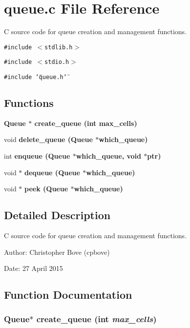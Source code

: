\section{queue.c File Reference}
\label{queue_8c}
C source code for queue creation and management functions. 

{\tt \#include $<$stdlib.h$>$}\par
{\tt \#include $<$stdio.h$>$}\par
{\tt \#include \char`\"{}queue.h\char`\"{}}\par
\subsection*{Functions}
\begin{CompactItemize}
\item 
\bf{Queue} $\ast$ \bf{create\_\-queue} (int max\_\-cells)
\item 
void \bf{delete\_\-queue} (\bf{Queue} $\ast$which\_\-queue)
\item 
int \bf{enqueue} (\bf{Queue} $\ast$which\_\-queue, void $\ast$ptr)
\item 
void $\ast$ \bf{dequeue} (\bf{Queue} $\ast$which\_\-queue)
\item 
void $\ast$ \bf{peek} (\bf{Queue} $\ast$which\_\-queue)
\end{CompactItemize}


\subsection{Detailed Description}
C source code for queue creation and management functions. 

\begin{Desc}
\item[Author:]Christopher Bove (cpbove) \end{Desc}
\begin{Desc}
\item[Date:]27 April 2015 \end{Desc}


\subsection{Function Documentation}
\subsubsection{\setlength{\rightskip}{0pt plus 5cm}\bf{Queue}$\ast$ create\_\-queue (int {\em max\_\-cells})}\label{queue_8c_37f0ebf6bb3301f99bc42638a41ab12e}


